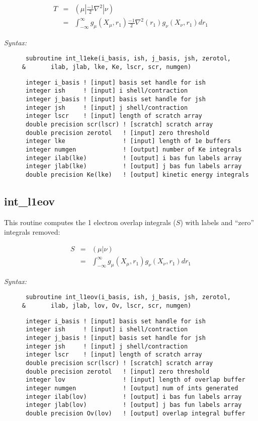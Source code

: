 \begin{eqnarray*} 
T & = & ({\mu}|\frac{-1}{2}\nabla^{2}|{\nu}) \\ 
  & = & \int_{-\infty}^{\infty} g_{\mu}(X_{\mu},r_{1})\frac{-1}{2}\nabla^{2}(r_{1})g_{\nu}(X_{\nu},r_{1})dr_{1} 
\end{eqnarray*} 
 
{\it Syntax:} 
\begin{verbatim} 
      subroutine int_l1eke(i_basis, ish, j_basis, jsh, zerotol, 
     &       ilab, jlab, lke, Ke, lscr, scr, numgen)  
\end{verbatim} 
\begin{verbatim} 
      integer i_basis ! [input] basis set handle for ish 
      integer ish     ! [input] i shell/contraction 
      integer j_basis ! [input] basis set handle for jsh 
      integer jsh     ! [input] j shell/contraction 
      integer lscr    ! [input] length of scratch array 
      double precision scr(lscr) ! [scratch] scratch array 
      double precision zerotol   ! [input] zero threshold 
      integer lke                ! [input] length of 1e buffers 
      integer numgen             ! [output] number of Ke integrals 
      integer ilab(lke)          ! [output] i bas fun labels array 
      integer jlab(lke)          ! [output] j bas fun labels array 
      double precision Ke(lke)   ! [output] kinetic energy integrals 
\end{verbatim} 
\subsection{int\_l1eov} 
This routine computes the 1 electron overlap integrals ($S$) 
with labels and ``zero'' integrals removed: 
 
\begin{eqnarray*} 
S & = & ({\mu}|{\nu}) \\ 
  & = & \int_{-\infty}^{\infty} g_{\mu}(X_{\mu},r_{1})g_{\nu}(X_{\nu},r_{1})dr_{1} 
\end{eqnarray*} 
 
{\it Syntax:} 
\begin{verbatim} 
      subroutine int_l1eov(i_basis, ish, j_basis, jsh, zerotol, 
     &       ilab, jlab, lov, Ov, lscr, scr, numgen)  
\end{verbatim} 
\begin{verbatim} 
      integer i_basis ! [input] basis set handle for ish 
      integer ish     ! [input] i shell/contraction 
      integer j_basis ! [input] basis set handle for jsh 
      integer jsh     ! [input] j shell/contraction 
      integer lscr    ! [input] length of scratch array 
      double precision scr(lscr) ! [scratch] scratch array 
      double precision zerotol   ! [input] zero threshold 
      integer lov                ! [input] length of overlap buffer 
      integer numgen             ! [output] num of ints generated 
      integer ilab(lov)          ! [output] i bas fun labels array 
      integer jlab(lov)          ! [output] j bas fun labels array 
      double precision Ov(lov)   ! [output] overlap integral buffer 
\end{verbatim} 
